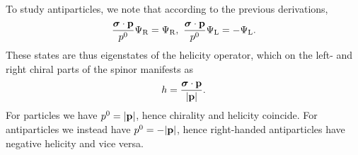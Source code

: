 To study antiparticles, we note that according to the previous derivations,
\begin{align*}
	\frac{\vb*{\sigma}\cdot\vb{p}}{p^{0}}\Psi_{\text{R}} = \Psi_{\text{R}},\ \frac{\vb*{\sigma}\cdot\vb{p}}{p^{0}}\Psi_{\text{L}} = -\Psi_{\text{L}}.
\end{align*}
These states are thus eigenstates of the helicity operator, which on the left- and right chiral parts of the spinor manifests as
\begin{align*}
	h = \frac{\vb*{\sigma}\cdot\vb{p}}{\abs{\vb{p}}}.
\end{align*}
For particles we have $p^{0} = \abs{\vb{p}}$, hence chirality and helicity coincide. For antiparticles we instead have $p^{0} = -\abs{\vb{p}}$, hence right-handed antiparticles have negative helicity and vice versa.